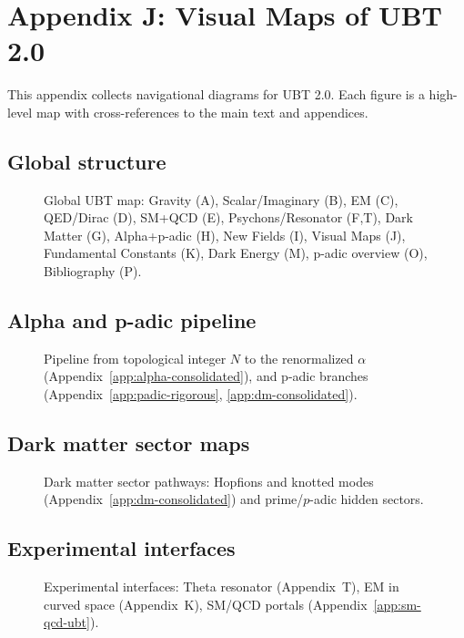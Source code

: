 \section{Appendix J: Visual Maps of UBT 2.0}
\label{app:visual-maps}

This appendix collects navigational diagrams for UBT 2.0. Each figure is a high-level map with cross-references to the main text and appendices.

\subsection{Global structure}
\begin{figure}[h]
  \centering
  \caption{Global UBT map: Gravity (A), Scalar/Imaginary (B), EM (C), QED/Dirac (D), SM+QCD (E), Psychons/Resonator (F,T), Dark Matter (G), Alpha+p-adic (H), New Fields (I), Visual Maps (J), Fundamental Constants (K), Dark Energy (M), p-adic overview (O), Bibliography (P).}
  \label{fig:ubt-global-map}
\end{figure}

\subsection{Alpha and p-adic pipeline}
\begin{figure}[h]
  \centering
  \caption{Pipeline from topological integer $N$ to the renormalized $\alpha$ (Appendix~\ref{app:alpha-consolidated}), and p-adic branches (Appendix~\ref{app:padic-rigorous}, \ref{app:dm-consolidated}).}
  \label{fig:alpha-padic-pipeline}
\end{figure}

\subsection{Dark matter sector maps}
\begin{figure}[h]
  \centering
  \caption{Dark matter sector pathways: Hopfions and knotted modes (Appendix~\ref{app:dm-consolidated}) and prime/$p$-adic hidden sectors.}
  \label{fig:dm-sector-map}
\end{figure}

\subsection{Experimental interfaces}
\begin{figure}[h]
  \centering
  \caption{Experimental interfaces: Theta resonator (Appendix~T), EM in curved space (Appendix~K), SM/QCD portals (Appendix~\ref{app:sm-qcd-ubt}).}
  \label{fig:experimental-interfaces}
\end{figure}
